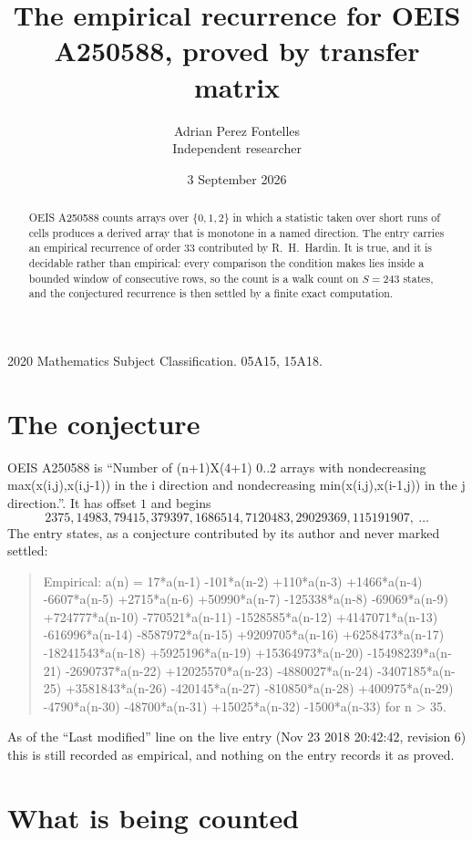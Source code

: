 \documentclass[11pt,a4paper]{article}
\title{The empirical recurrence for OEIS A250588, proved by transfer matrix}
\author{Adrian Perez Fontelles\\ \small Independent researcher}
\date{3 September 2026}
\theoremstyle{plain}
\theoremstyle{definition}
\begin{document}
\maketitle

\begin{abstract}
OEIS A250588 counts arrays over $\{0,1,2\}$ in which a statistic taken over short runs
of cells produces a derived array that is monotone in a named direction. The entry carries an
empirical recurrence of order $33$ contributed by R.~H.~Hardin. It is true, and it is
decidable rather than empirical: every comparison the condition makes lies inside a bounded
window of consecutive rows, so the count is a walk count on $S=243$ states, and the
conjectured recurrence is then settled by a finite exact computation.
\end{abstract}

\noindent\small 2020 Mathematics Subject Classification. 05A15, 15A18.\normalsize

\section{The conjecture}

OEIS A250588 is ``Number of (n+1)X(4+1) 0..2 arrays with nondecreasing max(x(i,j),x(i,j-1)) in the i direction and nondecreasing min(x(i,j),x(i-1,j)) in the j direction.''. It has offset $1$ and begins
\[
2375, 14983, 79415, 379397, 1686514, 7120483, 29029369, 115191907,\ \dots
\]
The entry states, as a conjecture contributed by its author and never marked settled:
\begin{quote}
Empirical: a(n) = 17*a(n-1) -101*a(n-2) +110*a(n-3) +1466*a(n-4) -6607*a(n-5) +2715*a(n-6) +50990*a(n-7) -125338*a(n-8) -69069*a(n-9) +724777*a(n-10) -770521*a(n-11) -1528585*a(n-12) +4147071*a(n-13) -616996*a(n-14) -8587972*a(n-15) +9209705*a(n-16) +6258473*a(n-17) -18241543*a(n-18) +5925196*a(n-19) +15364973*a(n-20) -15498239*a(n-21) -2690737*a(n-22) +12025570*a(n-23) -4880027*a(n-24) -3407185*a(n-25) +3581843*a(n-26) -420145*a(n-27) -810850*a(n-28) +400975*a(n-29) -4790*a(n-30) -48700*a(n-31) +15025*a(n-32) -1500*a(n-33) for n > 35.
\end{quote}
As of the ``Last modified'' line on the live entry (Nov 23 2018 20:42:42, revision 6) this is still
recorded as empirical, and nothing on the entry records it as proved.

\section{What is being counted}
\end{document}

